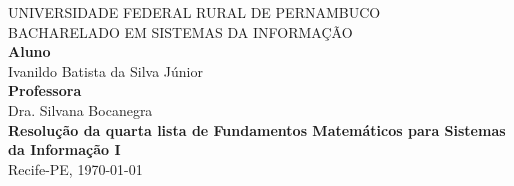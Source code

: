 \documentclass[12pt]{article}
\begin{document}
\begin{titlepage}
\centering
 \vfill
  \begin{center}


   {\large {UNIVERSIDADE FEDERAL RURAL DE PERNAMBUCO \\
BACHARELADO EM SISTEMAS DA INFORMAÇÃO
}}\\[4cm]

   {\large {\textbf{Aluno} \\
   Ivanildo Batista da Silva Júnior
   }}\\[.5cm]
   
   {\large {\textbf{Professora}\\ Dra. Silvana Bocanegra}}\\[3cm]
   {\large \textbf{Resolução da quarta lista de Fundamentos Matemáticos para Sistemas da Informação I}}\\[10.5cm] 
   
\normalsize {Recife-PE, \today}
\newpage

  \vfill
\end{center}
\end{titlepage}


\newpage

\tableofcontents
\thispagestyle{empty}
\newpage

\newpage
\setcounter{page}{1}
\end{document}
